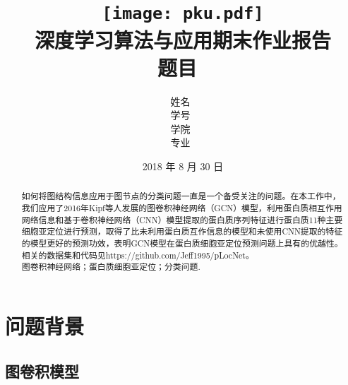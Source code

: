 \documentclass[a4paper,UTF8]{article}
\begin{document}
\title{
	\texttt{[image: pku.pdf]}\\
	\vspace{2em}
	\textbf{\huge{深度学习算法与应用期末作业报告}}\\
	\vspace{1em}
	\large{题目\ \underline{}}
}

\author{姓名\ \underline{}\\
	学号\ \underline{}\\
	学院\ \underline{}\\
	专业\ \underline{}
}

\date{2018 年 8 月 30 日}


\maketitle
\thispagestyle{empty}

\newpage


\tableofcontents

\newpage

\section*{}
\begin{abstract}
	\quad 如何将图结构信息应用于图节点的分类问题一直是一个备受关注的问题。在本工作中，我们应用了2016年Kipf等人发展的图卷积神经网络（GCN）模型，利用蛋白质相互作用网络信息和基于卷积神经网络（CNN）模型提取的蛋白质序列特征进行蛋白质11种主要细胞亚定位进行预测，取得了比未利用蛋白质互作信息的模型和未使用CNN提取的特征的模型更好的预测功效，表明GCN模型在蛋白质细胞亚定位预测问题上具有的优越性。相关的数据集和代码见https://github.com/Jeff1995/pLocNet。
 \\
 
	 图卷积神经网络；蛋白质细胞亚定位；分类问题.
\end{abstract}\thispagestyle{empty}
\newpage{}
\section{问题背景}
\subsection{图卷积模型}
\end{document}
